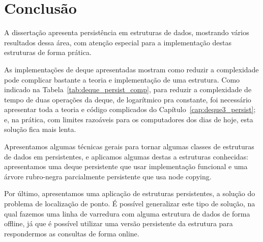 \documentclass[main.tex]{subfiles}
\begin{document}
\setcounter{secnumdepth}{0}

\chapter*{Conclusão}

A dissertação apresenta persistência em estruturas de dados, mostrando vários resultados dessa área, com atenção especial para a implementação destas estruturas de forma prática.

As implementações de deque apresentadas mostram como reduzir a complexidade pode complicar bastante a teoria e implementação de uma estrutura. Como indicado na Tabela~\ref{tab:deque_persist_comp}, para reduzir a complexidade de tempo de duas operações da deque, de logarítmico pra constante, foi necessário apresentar toda a teoria e código complicados do Capítulo~\ref{cap:deque3_persist}; e, na prática, com limites razoáveis para os computadores dos dias de hoje, esta solução fica mais lenta.

Apresentamos algumas técnicas gerais para tornar algumas classes de estruturas de dados em persistentes, e aplicamos algumas destas a estruturas conhecidas: apresentamos uma deque persistente que usar implementação funcional e uma árvore rubro-negra parcialmente persistente que usa node copying.

Por último, apresentamos uma aplicação de estruturas persistentes, a solução do problema de localização de ponto. É possível generalizar este tipo de solução, na qual fazemos uma linha de varredura com alguma estrutura de dados de forma offline, já que é possível utilizar uma versão persistente da estrutura para respondermos as consultas de forma online.

\setcounter{secnumdepth}{1}
\end{document}
